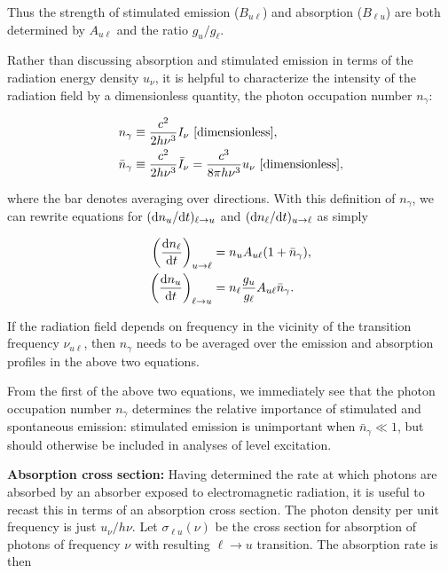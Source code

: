 \documentclass[a4paper,10pt]{article}
\begin{document}
{\noindent}Thus the strength of stimulated emission ($B_{u\ell}$) and absorption ($B_{\ell u}$) are both determined by $A_{u\ell}$ and the ratio $g_u/g_\ell$.

{\noindent}Rather than discussing absorption and stimulated emission in terms of the radiation energy density $u_\nu$, it is helpful to characterize the intensity of the radiation field by a dimensionless quantity, the photon occupation number $n_\gamma$:

\begin{align*}
    n_\gamma &\equiv \frac{c^2}{2h\nu^3} I_\nu ~ [{\rm dimensionless}], \\
    \bar{n}_\gamma &\equiv \frac{c^2}{2h\nu^3} \bar{I}_\nu = \frac{c^3}{8\pi h\nu^3} u_\nu ~ [{\rm dimensionless}],
\end{align*}

{\noindent}where the bar denotes averaging over directions. With this definition of $n_\gamma$, we can rewrite equations for $({\rm d}n_u/{\rm d}t)_{\ell\rightarrow u}$ and $({\rm d}n_\ell/{\rm d}t)_{u\rightarrow\ell}$ as simply

\begin{align*}
    \left(\frac{{\rm d}n_\ell}{{\rm d}t}\right)_{u\rightarrow\ell} &= n_uA_{u\ell}(1+\bar{n}_\gamma),\\
    \left(\frac{{\rm d}n_u}{{\rm d}t}\right)_{\ell\rightarrow u} &= n_\ell \frac{g_u}{g_\ell}A_{u\ell}\bar{n}_\gamma.
\end{align*}

{\noindent}If the radiation field depends on frequency in the vicinity of the transition frequency $\nu_{u\ell}$, then $n_\gamma$ needs to be averaged over the emission and absorption profiles in the above two equations.

{\noindent}From the first of the above two equations, we immediately see that the photon occupation number $n_\gamma$ determines the relative importance of stimulated and spontaneous emission: stimulated emission is unimportant when $\bar{n}_\gamma\ll1$, but should otherwise be included in analyses of level excitation.

{\noindent}\textbf{Absorption cross section:} Having determined the rate at which photons are absorbed by an absorber exposed to electromagnetic radiation, it is useful to recast this in terms of an absorption cross section. The photon density per unit frequency is just $u_\nu/h\nu$. Let $\sigma_{\ell u}(\nu)$ be the cross section for absorption of photons of frequency $\nu$ with resulting $\ell\rightarrow u$ transition. The absorption rate is then
\end{document}

